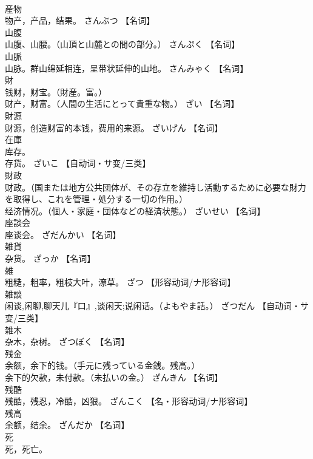 \documentclass[8pt]{extreport}
\begin{document}
\begin{CJK}{UTF8}{min}
\\	産物	
\\	物产，产品，结果。	さんぶつ		【名词】
\\	山腹	
\\	山腹、山腰。（山頂と山麓との間の部分。）	さんぷく		【名词】
\\	山脈	
\\	山脉。群山绵延相连，呈带状延伸的山地。	さんみゃく		【名词】
\\	財	
\\	钱财，财宝。（財産。富。） 
\\	财产，财富。（人間の生活にとって貴重な物。）	ざい		【名词】
\\	財源	
\\	财源，创造财富的本钱，费用的来源。	ざいげん		【名词】
\\	在庫	
\\	库存。 
\\	存货。	ざいこ		【自动词・サ变/三类】
\\	財政	
\\	财政。（国または地方公共団体が、その存立を維持し活動するために必要な財力を取得し、これを管理・処分する一切の作用。） 
\\	经济情况。（個人・家庭・団体などの経済状態。）	ざいせい		【名词】
\\	座談会	
\\	座谈会。	ざだんかい		【名词】
\\	雑貨	
\\	杂货。	ざっか		【名词】
\\	雑	
\\	粗糙，粗率，粗枝大叶，潦草。	ざつ		【形容动词/ナ形容词】
\\	雑談	
\\	闲谈,闲聊,聊天儿『口』,谈闲天;说闲话。（よもやま話。）	ざつだん		【自动词・サ变/三类】
\\	雑木	
\\	杂木，杂树。	ざつぼく		【名词】
\\	残金	
\\	余额，余下的钱。（手元に残っている金銭。残高。） 
\\	余下的欠款，未付款。（未払いの金。）	ざんきん		【名词】
\\	残酷	
\\	残酷，残忍，冷酷，凶狠。	ざんこく		【名・形容动词/ナ形容词】
\\	残高	
\\	余额，结余。	ざんだか		【名词】
\\	死	
\\	死，死亡。 

\end{CJK}
\end{document}
